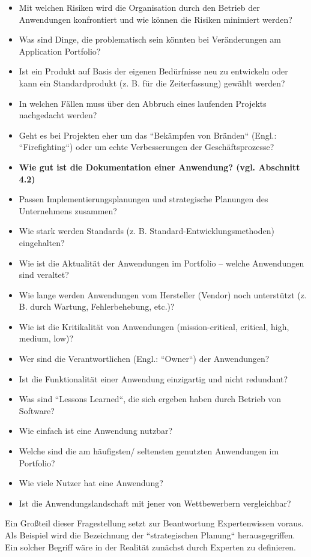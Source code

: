 \begin{itemize}
\item Mit welchen Risiken wird die Organisation durch den Betrieb der Anwendungen konfrontiert und wie können die Risiken minimiert werden?
\item Was sind Dinge, die problematisch sein könnten bei Veränderungen am Application Portfolio?
\item Ist ein Produkt auf Basis der eigenen Bedürfnisse neu zu entwickeln oder kann ein Standardprodukt (z. B. für die Zeiterfassung) gewählt werden?
\item In welchen Fällen muss über den Abbruch eines laufenden Projekts nachgedacht werden?
\item Geht es bei Projekten eher um das ``Bekämpfen von Bränden`` (Engl.: ``Firefighting``) oder um echte Verbesserungen der Geschäftsprozesse?
\item {\bf Wie gut ist die Dokumentation einer Anwendung? (vgl. Abschnitt 4.2)}
\item Passen Implementierungsplanungen und strategische Planungen des Unternehmens zusammen?
\item Wie stark werden Standards (z. B. Standard-Entwicklungsmethoden) eingehalten?
\item Wie ist die Aktualität der Anwendungen im Portfolio – welche Anwendungen sind veraltet?
\item Wie lange werden Anwendungen vom Hersteller (Vendor) noch unterstützt (z. B. durch Wartung, Fehlerbehebung, etc.)?
\item Wie ist die Kritikalität von Anwendungen (mission-critical, critical, high, medium, low)?
\item Wer sind die Verantwortlichen (Engl.: ``Owner``) der Anwendungen?
\item Ist die Funktionalität einer Anwendung einzigartig und nicht redundant?
\item Was sind ``Lessons Learned``, die sich ergeben haben durch Betrieb von Software?
\item Wie einfach ist eine Anwendung nutzbar?
\item Welche sind die am häufigsten/ seltensten genutzten Anwendungen im Portfolio?
\item Wie viele Nutzer hat eine Anwendung?
\item Ist die Anwendungslandschaft mit jener von Wettbewerbern vergleichbar?

\end{itemize}

Ein Großteil dieser Fragestellung setzt zur Beantwortung Expertenwissen voraus. Als Beispiel wird die Bezeichnung der ``strategischen Planung`` herausgegriffen. Ein solcher Begriff wäre in der Realität zunächst durch Experten zu definieren. 

